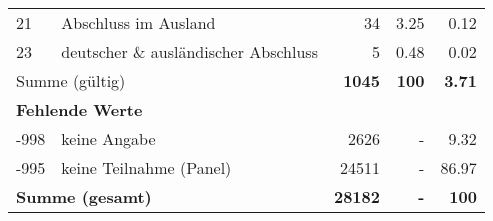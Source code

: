 \begin{longtable}{lXrrr}
     21 &
     \multicolumn{1}{X}{ Abschluss im Ausland   } &


       \num{34} &
       \num[round-mode=places,round-precision=2]{3.25} &
         \num[round-mode=places,round-precision=2]{0.12} \\

     23 &
     \multicolumn{1}{X}{ deutscher \& ausländischer Abschluss   } &


       \num{5} &
       \num[round-mode=places,round-precision=2]{0.48} &
         \num[round-mode=places,round-precision=2]{0.02} \\
     \midrule
     \multicolumn{2}{l}{Summe (gültig)} &
       \textbf{\num{1045}} &
     \textbf{100} &
       \textbf{\num[round-mode=places,round-precision=2]{3.71}} \\
     \multicolumn{5}{l}{\textbf{Fehlende Werte}}\\
       -998 &
       keine Angabe &
         \num{2626} &
        - &
         \num[round-mode=places,round-precision=2]{9.32} \\
       -995 &
       keine Teilnahme (Panel) &
         \num{24511} &
        - &
         \num[round-mode=places,round-precision=2]{86.97} \\
     \midrule
     \multicolumn{2}{l}{\textbf{Summe (gesamt)}} &
          \textbf{\num{28182}} &
        \textbf{-} &
        \textbf{100} \\
     \bottomrule
     \end{longtable}
     
